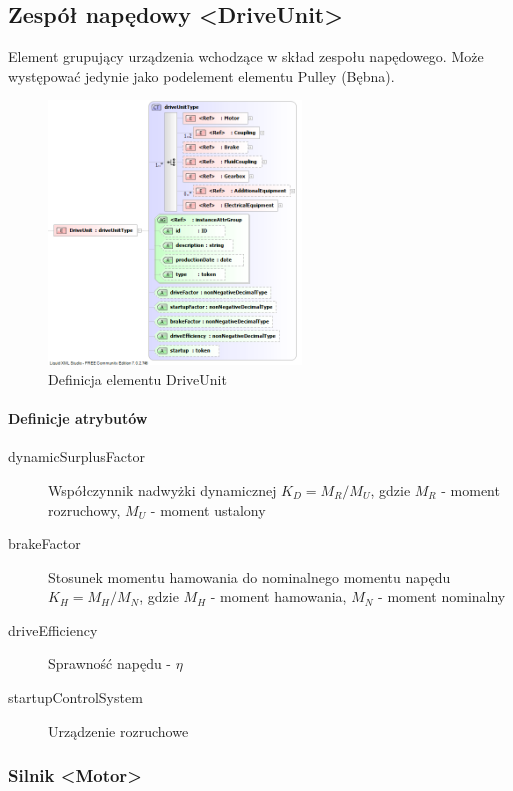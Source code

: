 \documentclass[12pt,a4paper]{article}
\begin{document}
\subsection{Zespół napędowy <DriveUnit>}
Element grupujący urządzenia wchodzące w skład zespołu napędowego. Może występować
jedynie jako podelement elementu Pulley (Bębna).

\begin{figure}[h]
  \centering
  \includegraphics[width=0.6\textwidth]{png/liquid/DriveUnit}
  \caption{Definicja elementu DriveUnit}
  \label{fig:driveUnit-xsd}
\end{figure}

\paragraph{Definicje atrybutów}
\begin{description}
\item[dynamicSurplusFactor] Współczynnik nadwyżki dynamicznej $K_D = M_R/M_U$,
	gdzie $M_R$ - moment rozruchowy, $M_U$ - moment ustalony 
\item[brakeFactor] Stosunek momentu hamowania do nominalnego momentu napędu $K_H = M_H/M_N$,
	gdzie $M_H$ - moment hamowania, $M_N$ - moment nominalny
\item[driveEfficiency] Sprawność napędu - $\eta$
\item[startupControlSystem] Urządzenie rozruchowe
\end{description}

\subsubsection{Silnik <Motor>}
\end{document}
